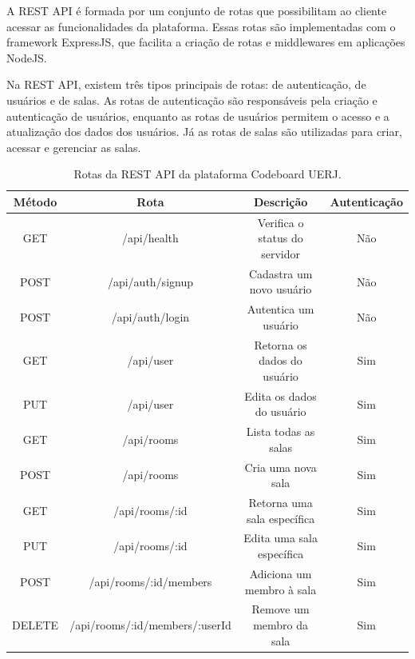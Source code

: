 A REST API é formada por um conjunto de rotas que possibilitam ao cliente acessar as funcionalidades da plataforma. Essas rotas são implementadas com o framework ExpressJS, que facilita a criação de rotas e middlewares em aplicações NodeJS.

Na REST API, existem três tipos principais de rotas: de autenticação, de usuários e de salas. As rotas de autenticação são responsáveis pela criação e autenticação de usuários, enquanto as rotas de usuários permitem o acesso e a atualização dos dados dos usuários. Já as rotas de salas são utilizadas para criar, acessar e gerenciar as salas.

\begin{table}[H]
    \centering
    \renewcommand{\arraystretch}{1.3} 
    \begin{tabular}{|c|c|c|c|}
        \hline
        \textbf{Método} & \textbf{Rota}                  & \textbf{Descrição}            & \textbf{Autenticação} \\
        \hline
        GET             & /api/health                    & Verifica o status do servidor & Não                   \\
        \hline
        POST            & /api/auth/signup               & Cadastra um novo usuário      & Não                   \\
        POST            & /api/auth/login                & Autentica um usuário          & Não                   \\
        \hline
        GET             & /api/user                      & Retorna os dados do usuário   & Sim                   \\
        PUT             & /api/user                      & Edita os dados do usuário     & Sim                   \\
        \hline
        GET             & /api/rooms                     & Lista todas as salas          & Sim                   \\
        POST            & /api/rooms                     & Cria uma nova sala            & Sim                   \\
        GET             & /api/rooms/:id                 & Retorna uma sala específica   & Sim                   \\
        PUT             & /api/rooms/:id                 & Edita uma sala específica     & Sim                   \\
        POST            & /api/rooms/:id/members         & Adiciona um membro à sala     & Sim                   \\
        DELETE          & /api/rooms/:id/members/:userId & Remove um membro da sala      & Sim                   \\
        \hline
    \end{tabular}
    \caption{Rotas da REST API da plataforma Codeboard UERJ.}
    \label{tab:rest-api-routes}
\end{table}


